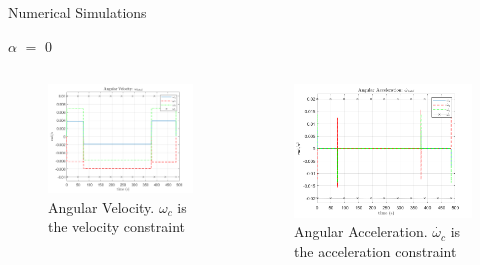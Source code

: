 \documentclass{beamer}
\begin{document}
\begin{frame}{Numerical Simulations}
	\begin{block}{$\alpha$ $=$ 0}
		
		\begin{columns}
			\begin{column}{0.5\textwidth}
				\begin{figure}[H]
					\label{fig:ang_vel_alpha0}
					\begin{center}
						\includegraphics[width=2.25in]{figures/alpha0/ang_vel.png}
					\end{center}
					\caption{Angular Velocity. $\omega_c$ is the velocity constraint}
				\end{figure}
			\end{column}
			\begin{column}{0.5\textwidth}
				\begin{figure}[H]
					\label{fig:ang_accel_alpha0}
					\begin{center}
						\includegraphics[width=2.25in]{figures/alpha0/ang_accel.png}
					\end{center}
					\caption{Angular Acceleration. $\dot{\omega_c}$ is the acceleration constraint}
				\end{figure}
			\end{column}
		\end{columns}
	
	\end{block}
\end{frame}
\end{document}
